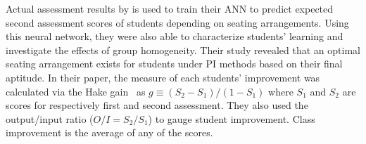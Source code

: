 \documentclass[twocolumn,secnumarabic,amssymb, nobibnotes, aps, prd]{revtex4-2}
\begin{document}




    Actual assessment results by \citet{roxas2010seating} is used to train their ANN to predict expected second assessment scores of students depending on seating arrangements.
    Using this neural network, they were also able to characterize students' learning and investigate the effects of group homogeneity. 
    Their study revealed that an optimal seating arrangement exists for students under PI methods based on their final aptitude.
    In their paper, the measure of each students' improvement was calculated via the Hake gain~\cite{hake1998} as 
    $g \equiv (S_2 - S_1) / (1 - S_1)$
    where $S_1$ and $S_2$ are scores for respectively first and second assessment.
    They also used the output/input ratio ($O/I = S_2/S_1$) to gauge student improvement.
    Class improvement is the average of any of the scores.
\end{document}
